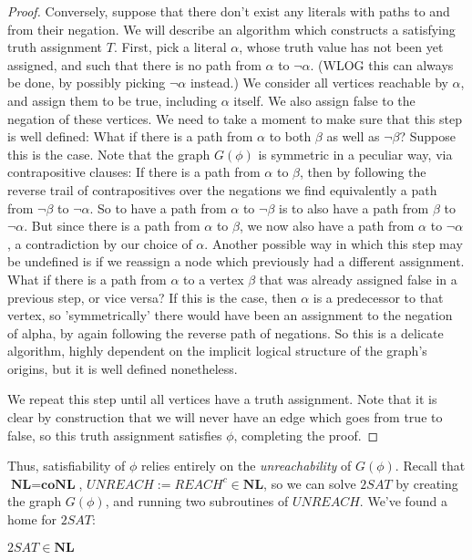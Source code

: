 \begin{proof}
    \par Conversely, suppose that there don't exist any literals with paths to and from their negation. We will describe an algorithm which constructs a satisfying truth assignment $T$. First, pick a literal $\alpha$, whose truth value has not been yet assigned, and such that there is no path from $\alpha$ to $\neg \alpha$. (WLOG this can always be done, by possibly picking $\neg \alpha$ instead.) We consider all vertices reachable by $\alpha$, and assign them to be true, including $\alpha$ itself. We also assign false to the negation of these vertices. We need to take a moment to make sure that this step is well defined: What if there is a path from $\alpha$ to both $\beta$ as well as $\neg \beta$? Suppose this is the case. Note that the graph $G(\phi)$ is symmetric in a peculiar way, via contrapositive clauses: If there is a path from $\alpha$ to $\beta$, then by following the reverse trail of contrapositives over the negations we find equivalently a path from $\neg \beta$ to $\neg \alpha$. So to have a path from $\alpha$ to $\neg \beta$ is to also have a path from $\beta$ to $\neg \alpha$. But since there is a path from $\alpha$ to $\beta$, we now also have a path from $\alpha$ to $\neg \alpha$, a contradiction by our choice of $\alpha$. Another possible way in which this step may be undefined is if we reassign a node which previously had a different assignment. What if there is a path from $\alpha$ to a vertex $\beta$ that was already assigned false in a previous step, or vice versa? If this is the case, then $\alpha$ is a predecessor to that vertex, so 'symmetrically' there would have been an assignment to the negation of alpha, by again following the reverse path of negations. So this is a delicate algorithm, highly dependent on the implicit logical structure of the graph's origins, but it is well defined nonetheless.
    \par We repeat this step until all vertices have a truth assignment. Note that it is clear by construction that we will never have an edge which goes from true to false, so this truth assignment satisfies $\phi$, completing the proof.
\end{proof}
    Thus, satisfiability of $\phi$ relies entirely on the \textit{unreachability} of $G(\phi)$. Recall that $\textbf{NL} = \textbf{coNL}$, $UNREACH := REACH^c \in \textbf{NL}$, so we can solve $2SAT$ by creating the graph $G(\phi)$, and running two subroutines of $UNREACH$. We've found a home for $2SAT$: 
\begin{corollary}
    $2SAT \in \textbf{NL}$
\end{corollary}
